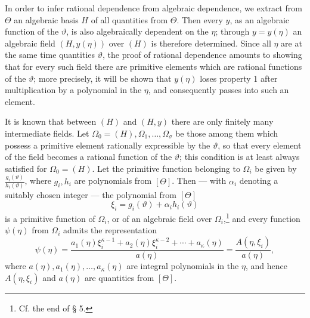 \documentclass[11pt]{article}
\begin{document}
In order to infer rational dependence from algebraic dependence, we extract from
$\Theta$ an algebraic basis $H$ of all quantities from $\Theta$. Then every $y$,
as an algebraic function of the $\vartheta$, is also algebraically dependent on
the $\eta$; through $y=y(\eta)$ an algebraic field $(H,y(\eta))$ over $(H)$ is
therefore determined. Since all $\eta$ are at the same time quantities
$\vartheta$, the proof of rational dependence amounts to showing that for every
such field there are primitive elements which are rational functions of the
$\vartheta$; more precisely, it will be shown that $y(\eta)$ loses property 1
after multiplication by a polynomial in the $\eta$, and consequently passes into
such an element.

It is known that between $(H)$ and $(H,y)$ there are only finitely many
intermediate fields. Let $\Omega_0=(H),\Omega_1,\ldots,\Omega_\sigma$ be those
among them which possess a primitive element rationally expressible by the
$\vartheta$, so that every element of the field becomes a rational function of
the $\vartheta$; this condition is at least always satisfied for $\Omega_0=(H)$.
Let the primitive function belonging to $\Omega_i$ be given by
$\frac{g_i(\vartheta)}{h_i(\vartheta)}$, where $g_i,h_i$ are polynomials from
$[\Theta]$. Then --- with $\alpha_i$ denoting a suitably chosen integer --- the
polynomial from $[\Theta]$
\[
 \xi_i=g_i(\vartheta)+\alpha_i h_i(\vartheta)
\]
is a primitive function of $\Omega_i$, or of an algebraic field over
$\Omega_i$,\footnote{Cf. the end of § 5.} and every function $\psi(\eta)$ from
$\Omega_i$ admits the representation
\begin{equation}
\psi(\eta)=
\frac{a_1(\eta)\xi_i^{\kappa-1}+a_2(\eta)\xi_i^{\kappa-2}+\cdots+a_\kappa(\eta)}
     {a(\eta)}
=\frac{A(\eta,\xi_i)}{a(\eta)},
\tag{2}
\end{equation}
where $a(\eta),a_1(\eta),\ldots,a_\kappa(\eta)$ are integral polynomials in the
$\eta$, and hence $A(\eta,\xi_i)$ and $a(\eta)$ are quantities from $[\Theta]$.
\end{document}
